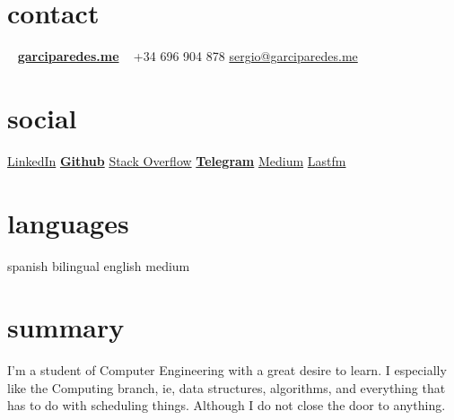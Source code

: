 \documentclass[]{friggeri-cv} %
\begin{document}


    \begin{aside} %

        \section{contact}
            ~
            \href{http://garciparedes.me}{\textbf{garciparedes.me}}
            ~
            +34 696 904 878
            \href{mailto:sergio@garciparedes.me}{sergio@garciparedes.me}
        \section{social}
            \href{https://es.linkedin.com/in/garciparedes/en}{LinkedIn\quad\faLinkedin }
            \href{https://github.com/garciparedes}{\quad{\color{red} $\varheartsuit$}\quad\textbf{Github}\quad\faGithub }
            \href{http://stackoverflow.com/users/3921457/garciparedes}{Stack Overflow\quad\faStackOverflow }
            \href{https://telegram.me/garciparedes}{\textbf{Telegram}\quad\faPaperPlane }
            \href{https://medium.com/@garciparedes}{Medium\quad\faMedium }
            \href{http://www.last.fm/user/garciparedes/}{Lastfm\quad\faLastfm}
        \section{languages}
            spanish bilingual
            english medium
    \end{aside}




    \section{summary}

        I'm a student of Computer Engineering with a great desire to learn. I especially like the Computing branch, ie, data structures, algorithms, and everything that has to do with scheduling things. Although I do not close the door to anything.
\end{document}
